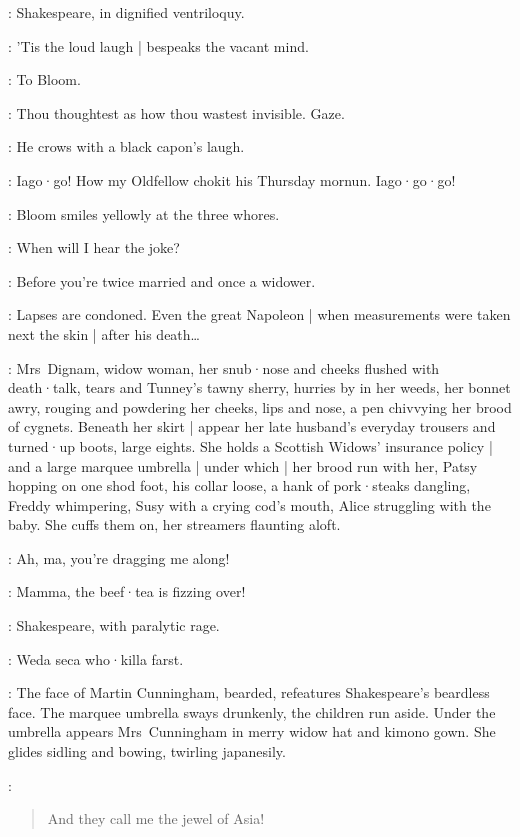 :
Shakespeare,
in dignified ventriloquy.

\Shakespeare:
'Tis the loud laugh |
bespeaks the vacant mind.

:
To Bloom.

\Shakespeare:
Thou thoughtest as how thou wastest invisible.
Gaze.

:
He crows with a black capon's laugh.

\Shakespeare:
Iago·go!
How my Oldfellow chokit his Thursday mornun.
Iago·go·go!

:
Bloom smiles yellowly at the three whores.

\Bloom:
When will I hear the joke?

\Zoe:
Before you're twice married and once a widower.

\Bloom:
Lapses are condoned.
Even the great Napoleon |
when measurements were taken next the skin |
after his death…

:
Mrs~Dignam,
widow woman,
her snub·nose and cheeks flushed with death·talk,
tears and Tunney's tawny sherry,
hurries by in her weeds,
her bonnet awry,
rouging and powdering her cheeks,
lips and nose,
a pen chivvying her brood of cygnets.
%
Beneath her skirt |
appear her late husband's everyday trousers and turned·up boots,
large eights.
She holds a Scottish Widows' insurance policy |
and a large marquee umbrella |
under which |
her brood run with her,
Patsy hopping on one shod foot,
his collar loose,
a hank of pork·steaks dangling,
Freddy whimpering,
Susy with a crying cod's mouth,
Alice struggling with the baby.
She cuffs them on,
her streamers flaunting aloft.

\Freddy[1]:
Ah,
ma,
you're dragging me along!

\Susy[2]:
Mamma,
the beef·tea is fizzing over!

:
Shakespeare,
with paralytic rage.

\Shakespeare:
Weda seca who·killa farst.

:
The face of Martin Cunningham,
bearded,
refeatures Shakespeare's beardless face.
The marquee umbrella sways drunkenly,
the children run aside.
Under the umbrella appears Mrs~Cunningham in merry widow hat and kimono gown.
She glides sidling and bowing,
twirling japanesily.

\MrsCunningham:
\begin{verse}
    And they call me the jewel of Asia!
\end{verse}

